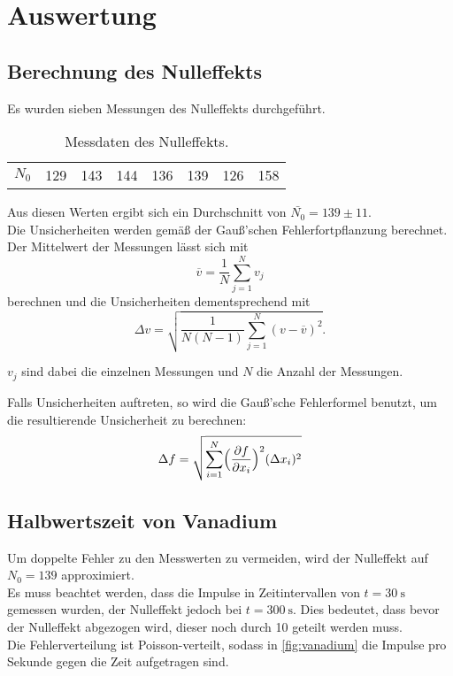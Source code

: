 \newpage
\section{Auswertung}
\label{auswertung}

\subsection{Berechnung des Nulleffekts}
Es wurden sieben Messungen des Nulleffekts durchgeführt.

\begin{table}
    \centering
    \caption{Messdaten des Nulleffekts.}
    \begin{tabular}{c|c|c|c|c|c|c|c}
        $N_0$ & 129 & 143 & 144 & 136 & 139 & 126 & 158\\
    \end{tabular}
\end{table}

Aus diesen Werten ergibt sich ein Durchschnitt von $\bar{N_0} = 139 \pm 11$.\\
Die Unsicherheiten werden gemäß der Gauß'schen Fehlerfortpflanzung berechnet.
Der Mittelwert der Messungen lässt sich mit
\begin{equation}
    \overline{v}=\frac{1}{N} \sum_{j=1}^N v_j
\end{equation}
berechnen und die Unsicherheiten dementsprechend mit
\begin{equation}
    \Delta v = \sqrt{\frac{1}{N(N-1)} \sum_{j=1}^N (v-\overline{v})^2}.
\end{equation}

\(v_j\) sind dabei die einzelnen Messungen und \(N\) die Anzahl der Messungen.

Falls Unsicherheiten auftreten, so wird die Gauß'sche Fehlerformel benutzt, um die resultierende Unsicherheit zu berechnen:
\begin{equation}
    \Delta f = \sqrt{\sum_{i=1}^N  \Bigl(\frac{\partial f}{\partial x_i}\Bigr)^2 (\Delta x_i)^2}
    \label{eq:gauß}
\end{equation}

\subsection{Halbwertszeit von Vanadium}
Um doppelte Fehler zu den Messwerten zu vermeiden, wird der Nulleffekt auf $N_0 = 139$ approximiert.\\
Es muss beachtet werden, dass die Impulse in Zeitintervallen von $t = \SI{30}{\second}$ gemessen wurden,
der Nulleffekt jedoch bei $t = \SI{300}{\second}$.
Dies bedeutet, dass bevor der Nulleffekt abgezogen wird, dieser noch durch 10 geteilt werden muss.\\
Die Fehlerverteilung ist Poisson-verteilt, sodass in \autoref{fig:vanadium} die Impulse pro Sekunde gegen die Zeit aufgetragen sind.

